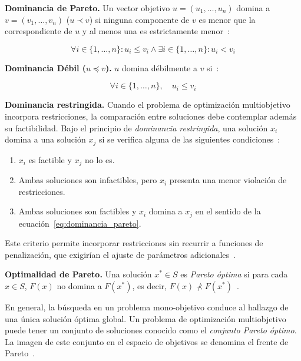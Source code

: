 \textbf{Dominancia de Pareto.} Un vector objetivo $u = (u_1, \ldots, u_n)$ domina a $v = (v_1, \ldots, v_n)$ ($u \prec v$) si ninguna componente de $v$ es menor que la correspondiente de $u$ y al menos una es estrictamente menor~\cite{talbi2009metaheuristics}:

\begin{equation}
\label{eq:dominancia_pareto}
\forall i \in \{1, \ldots, n\} : u_i \leq v_i \wedge \exists i \in \{1, \ldots, n\} : u_i < v_i
\end{equation}

\textbf{Dominancia Débil ($u \preceq v$).} $u$ domina débilmente a $v$ si~\cite{talbi2009metaheuristics}:

\begin{equation}
\label{eq:dominancia_debil}
\forall i \in \{1, \ldots, n\}, \quad u_i \leq v_i
\end{equation}

\textbf{Dominancia restringida.} Cuando el problema de optimización multiobjetivo incorpora restricciones, la comparación entre soluciones debe contemplar además su factibilidad. Bajo el principio de \textit{dominancia restringida}, una solución $x_i$ domina a una solución $x_j$ si se verifica alguna de las siguientes condiciones~\cite{deb2002nsga2}:

\begin{enumerate}
    \item $x_i$ es factible y $x_j$ no lo es.
    \item Ambas soluciones son infactibles, pero $x_i$ presenta una menor violación de restricciones.
    \item Ambas soluciones son factibles y $x_i$ domina a $x_j$ en el sentido de la ecuación~\eqref{eq:dominancia_pareto}.
\end{enumerate}

Este criterio permite incorporar restricciones sin recurrir a funciones de penalización, que exigirían el ajuste de parámetros adicionales~\cite{deb2002nsga2}.

\textbf{Optimalidad de Pareto.} Una solución $x^* \in S$ es \textit{Pareto óptima} si para cada $x \in S$, $F(x)$ no domina a $F(x^*)$, es decir, $F(x) \nprec F(x^*)$~\cite{talbi2009metaheuristics}.

En general, la búsqueda en un problema mono-objetivo conduce al hallazgo de una única solución óptima global. Un problema de optimización multiobjetivo puede tener un conjunto de soluciones conocido como el \textit{conjunto Pareto óptimo}. La imagen de este conjunto en el espacio de objetivos se denomina el frente de Pareto~\cite{talbi2009metaheuristics}.

